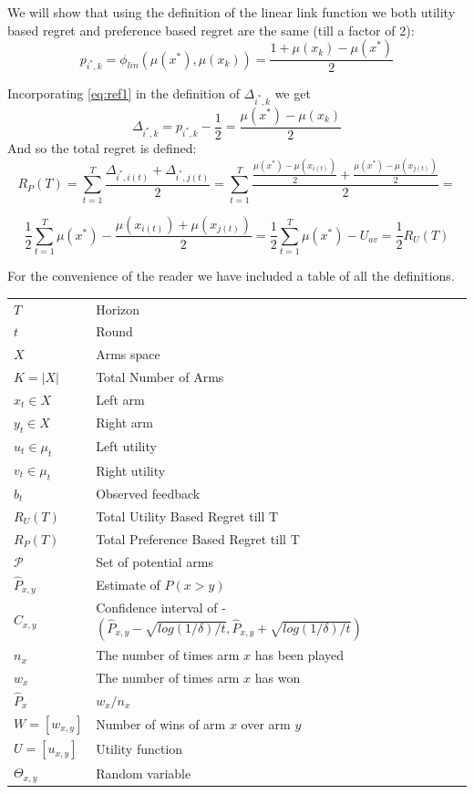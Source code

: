 \documentclass{llncs}
\begin{document}
	We will show that using the definition of the linear link function we both utility based regret and preference based regret are the same (till a factor of 2): 
	\begin{equation}\label{eq:ref1}
		p_{i^*,k} = \phi_{lin}(\mu(x^*),\mu(x_k)) = \frac{1 +\mu(x_k)-\mu(x^*)}{2}
	\end{equation}
	
	Incorporating \eqref{eq:ref1} in the definition of $\Delta_{i^*,k}$ we get
	$$
	\Delta_{i^*,k} = p_{i^*,k} - \frac{1}{2} = \frac{\mu(x^*)-\mu(x_k)}{2}
	$$
	And so the total regret is defined:
	$$ R_P(T) = \sum_{t=1}^T \frac{\Delta_{i^*,i(t)}+\Delta_{i^*,j(t)}}{2} =  
\sum_{t=1}^T \frac{\frac{\mu(x^*)-\mu(x_{i(t)})}{2}+\frac{\mu(x^*)-\mu(x_{j(t)})}{2}}{2} =
$$

$$
\frac{1}{2} \sum_{t=1}^T \mu(x^*) -\frac{
	\mu(x_{i(t)})+\mu(x_{j(t)})}{2} =
\frac{1}{2} \sum_{t=1}^T \mu(x^*)- U_{av} = \frac{1}{2}R_U(T)$$

\newpage

For the convenience of the reader we have included a table of all the definitions. 
	\begin{table}[h]
		\begin{tabular}{ll}
 			$T$ & Horizon \\
 			$t$ &  Round \\
 			$X$ & Arms space \\
 			$K = |X|$ & Total Number of Arms\\
 			$x_t \in X$ & Left arm \\
 			$y_t \in X$ & Right arm \\
 			$u_t \in \mu_t$ & Left utility \\
 			$v_t \in \mu_t$ & Right utility \\
 			$b_t$ & Observed feedback \\
 			$R_U(T)$ & Total Utility Based Regret till T\\
			$R_P(T)$ & Total Preference Based Regret till T\\
 			$\mathcal{P}$ & Set of potential arms \\
 			$\hat{P}_{x, y}$ & Estimate of $P(x>y)$\\
 			$\hat{C}_{x, y}$ &   Confidence interval of - $(\hat{P}_{x, y} - \sqrt{log(1/\delta)/t},\hat{P}_{x, y} +\sqrt{log(1/\delta)/t})$\\
 			$n_x$ &   The number of times arm $x$ has been played\\
 			$w_x$ & The number of times arm $x$ has won\\
 			$\hat{P}_x  $ &  $ w_x / n_x $\\
 			$ W = [w_{x,y}]$ & Number of wins of arm $x$ over arm $y$\\
 			$U = [u_{x,y}]$ &  Utility function\\
 			$\Theta_{x,y}$ &   Random variable
		\end{tabular}
	\end{table}
\end{document}
